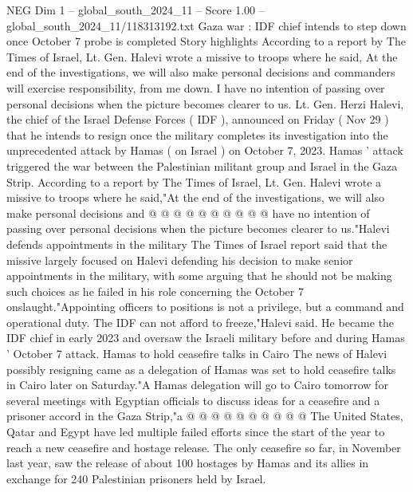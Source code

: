 \begin{textsample}{NEG Dim 1 – global\_south\_2024\_11 – Score 1.00 – global\_south\_2024\_11/118313192.txt}  \label{ex:f1_neg_200}
Gaza war : IDF chief intends to step down once October 7 probe is completed Story highlights According to a report by The Times of Israel, Lt.
Gen.
Halevi wrote a missive to troops where he said, At the end of the investigations, we will also make personal decisions and commanders will exercise responsibility, from me down.
I have no intention of passing over personal decisions when the picture becomes clearer to us.
Lt.
Gen.
Herzi Halevi, the chief of the Israel Defense Forces ( IDF ), announced on Friday ( Nov 29 ) that he intends to resign once the military completes its investigation into the unprecedented attack by Hamas ( on Israel ) on October 7, 2023.
Hamas ' attack triggered the war between the Palestinian militant group and Israel in the Gaza Strip.
According to a report by The Times of Israel, Lt.
Gen.
Halevi wrote a missive to troops where he said,"At the end of the investigations, we will also make personal decisions and @ @ @ @ @ @ @ @ @ @ have no intention of passing over personal decisions when the picture becomes clearer to us."Halevi defends appointments in the military The Times of Israel report said that the missive largely focused on Halevi defending his decision to make senior appointments in the military, with some arguing that he should not be making such choices as he failed in his role concerning the October 7 onslaught."Appointing officers to positions is not a privilege, but a command and operational duty.
The IDF can not afford to freeze,"Halevi said.
He became the IDF chief in early 2023 and oversaw the Israeli military before and during Hamas ' October 7 attack.
Hamas to hold ceasefire talks in Cairo The news of Halevi possibly resigning came as a delegation of Hamas was set to hold ceasefire talks in Cairo later on Saturday."A Hamas delegation will go to Cairo tomorrow for several meetings with Egyptian officials to discuss ideas for a ceasefire and a prisoner accord in the Gaza Strip,"a @ @ @ @ @ @ @ @ @ @ The United States, Qatar and Egypt have led multiple failed efforts since the start of the year to reach a new ceasefire and hostage release.
The only ceasefire so far, in November last year, saw the release of about 100 hostages by Hamas and its allies in exchange for 240 Palestinian prisoners held by Israel.

\end{textsample}
